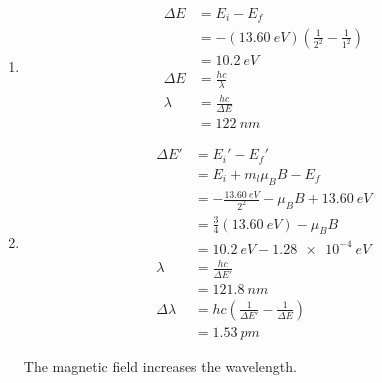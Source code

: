 \documentclass{article}
\begin{document}
\begin{enumerate}
  \item

        \begin{align*}
          \Delta E & = E_i - E_f                                                       \\
                   & = -(\qty{13.60}{eV}) \left( \frac{1}{2^2} - \frac{1}{1^2} \right) \\
                   & = \qty{10.2}{eV}                                                  \\
          \Delta E & = \frac{h c}{\lambda}                                             \\
          \lambda  & = \frac{h c}{\Delta E}                                            \\
                   & = \qty{122}{nm}
        \end{align*}

  \item

        \begin{align*}
          \Delta E'      & = E_i' - E_f'                                                 \\
                         & = E_i + m_l \mu_B B - E_f                                     \\
                         & = -\frac{\qty{13.60}{eV}}{2^2} - \mu_B B + \qty{13.60}{eV}    \\
                         & = \frac{3}{4} (\qty{13.60}{eV}) - \mu_B B                     \\
                         & = \qty{10.2}{eV} - \qty{1.28e-4}{eV}                          \\
          \lambda        & = \frac{h c}{\Delta E'}                                       \\
                         & = \qty{121.8}{nm}                                             \\
          \Delta \lambda & = h c \left( \frac{1}{\Delta E'} - \frac{1}{\Delta E} \right) \\
                         & = \qty{1.53}{pm}
        \end{align*}

        The magnetic field increases the wavelength.
\end{enumerate}

\setcounter{subsubsection}{64}
\subsubsection{}
\end{document}
